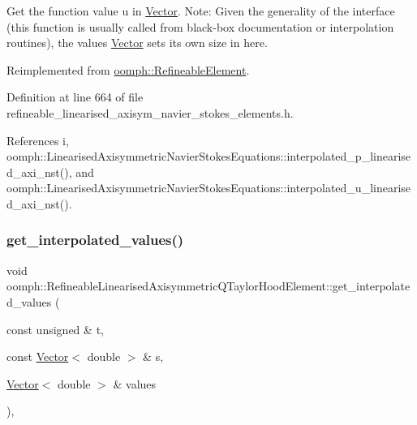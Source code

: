 Get the function value u in \hyperlink{classoomph_1_1Vector}{Vector}. Note\+: Given the generality of the interface (this function is usually called from black-\/box documentation or interpolation routines), the values \hyperlink{classoomph_1_1Vector}{Vector} sets its own size in here. 



Reimplemented from \hyperlink{classoomph_1_1RefineableElement_ad9a4f92880668a2373326d8306365c43}{oomph\+::\+Refineable\+Element}.



Definition at line 664 of file refineable\+\_\+linearised\+\_\+axisym\+\_\+navier\+\_\+stokes\+\_\+elements.\+h.



References i, oomph\+::\+Linearised\+Axisymmetric\+Navier\+Stokes\+Equations\+::interpolated\+\_\+p\+\_\+linearised\+\_\+axi\+\_\+nst(), and oomph\+::\+Linearised\+Axisymmetric\+Navier\+Stokes\+Equations\+::interpolated\+\_\+u\+\_\+linearised\+\_\+axi\+\_\+nst().

\mbox{\label{classoomph_1_1RefineableLinearisedAxisymmetricQTaylorHoodElement_a5fd2002a6e2e0090d560febdd21b36d4}} 
\subsubsection{\texorpdfstring{get\+\_\+interpolated\+\_\+values()}{get\_interpolated\_values()}\hspace{0.1cm}{\footnotesize\ttfamily [2/2]}}
{\footnotesize\ttfamily void oomph\+::\+Refineable\+Linearised\+Axisymmetric\+Q\+Taylor\+Hood\+Element\+::get\+\_\+interpolated\+\_\+values (\begin{DoxyParamCaption}\item[{const unsigned \&}]{t,  }\item[{const \hyperlink{classoomph_1_1Vector}{Vector}$<$ double $>$ \&}]{s,  }\item[{\hyperlink{classoomph_1_1Vector}{Vector}$<$ double $>$ \&}]{values }\end{DoxyParamCaption})\hspace{0.3cm}{\ttfamily [inline]}, {\ttfamily [virtual]}}




